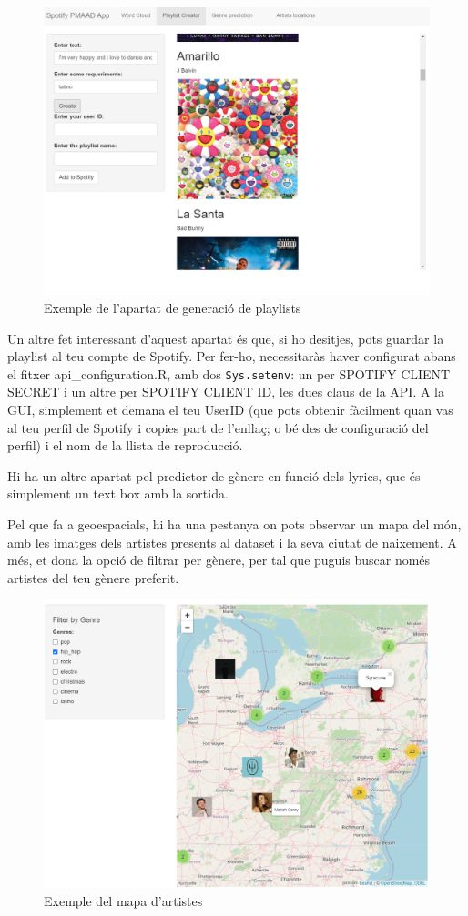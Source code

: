 \begin{figure}
    \centering
    \includegraphics[width=0.75\linewidth]{Images//9_GUI/gui_playlist.png}
    \caption{Exemple de l'apartat de generació de playlists}
    \label{fig:gui_playlist}
\end{figure}

Un altre fet interessant d'aquest apartat és que, si ho desitjes, pots guardar la playlist al teu compte de Spotify. Per fer-ho, necessitaràs haver configurat abans el fitxer api\_configuration.R, amb dos \texttt{Sys.setenv}: un per SPOTIFY CLIENT SECRET i un altre per SPOTIFY CLIENT ID, les dues claus de la API. A la GUI, simplement et demana el teu UserID (que pots obtenir fàcilment quan vas al teu perfil de Spotify i copies part de l'enllaç; o bé des de configuració del perfil) i el nom de la llista de reproducció.

Hi ha un altre apartat pel predictor de gènere en funció dels lyrics, que és simplement un text box amb la sortida.

Pel que fa a geoespacials, hi ha una pestanya on pots observar un mapa del món, amb les imatges dels artistes presents al dataset i la seva ciutat de naixement. A més, et dona la opció de filtrar per gènere, per tal que puguis buscar només artistes del teu gènere preferit.

\begin{figure}
    \centering
    \includegraphics[width=0.5\linewidth]{Images//9_GUI/gui_map_artists.png}
    \caption{Exemple del mapa d'artistes}
    \label{fig:gui_artist_map}
\end{figure}

